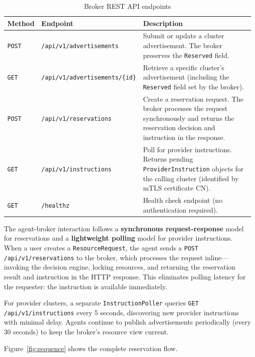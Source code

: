 \begin{table}[htbp]
\centering
\caption{Broker REST API endpoints}
\label{tab:api-endpoints}
\begin{tabular}{@{}llp{6.5cm}@{}}
\toprule
\textbf{Method} & \textbf{Endpoint} & \textbf{Description} \\
\midrule
\texttt{POST} & \texttt{/api/v1/advertisements} & Submit or update a cluster advertisement. The broker preserves the \texttt{Reserved} field. \\
\texttt{GET} & \texttt{/api/v1/advertisements/\{id\}} & Retrieve a specific cluster's advertisement (including the \texttt{Reserved} field set by the broker). \\
\texttt{POST} & \texttt{/api/v1/reservations} & Create a reservation request. The broker processes the request synchronously and returns the reservation decision and instruction in the response. \\
\texttt{GET} & \texttt{/api/v1/instructions} & Poll for provider instructions. Returns pending \texttt{ProviderInstruction} objects for the calling cluster (identified by mTLS certificate CN). \\
\texttt{GET} & \texttt{/healthz} & Health check endpoint (no authentication required). \\
\bottomrule
\end{tabular}
\end{table}

The agent-broker interaction follows a \textbf{synchronous request-response} model for reservations and a \textbf{lightweight polling} model for provider instructions. When a user creates a \texttt{ResourceRequest}, the agent sends a \texttt{POST /api/v1/reservations} to the broker, which processes the request inline---invoking the decision engine, locking resources, and returning the reservation result and instruction in the HTTP response. This eliminates polling latency for the requester: the instruction is available immediately.

For provider clusters, a separate \texttt{InstructionPoller} queries \texttt{GET /api/v1/instructions} every 5 seconds, discovering new provider instructions with minimal delay. Agents continue to publish advertisements periodically (every 30 seconds) to keep the broker's resource view current.

Figure~\ref{fig:sequence} shows the complete reservation flow.

